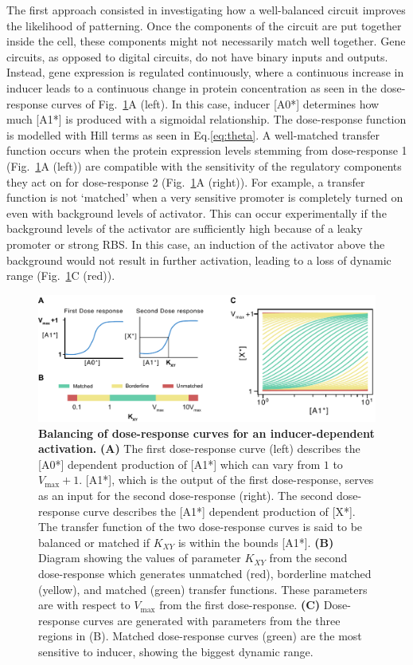The first approach consisted in investigating how a well-balanced circuit improves the likelihood of patterning.
Once the components of the circuit are put together inside the cell,
these components might not necessarily match well together.
Gene circuits, as opposed to digital circuits, do not have binary inputs and outputs.
Instead, gene expression is regulated continuously,
where a continuous increase in inducer leads to a continuous change in protein concentration
as seen in the dose-response curves of Fig.~\ref{fig:balancing}A
(left).
In this case, inducer [A0*] determines how much [A1*] is produced with a sigmoidal relationship.
The dose-response function is modelled with Hill terms as seen in Eq.\ref{eq:theta}.
A well-matched transfer function occurs when the protein expression levels stemming from dose-response 1
(Fig.~\ref{fig:balancing}A (left))
are compatible with the sensitivity of the regulatory components they act on for dose-response 2
(Fig.~\ref{fig:balancing}A (right)).
For example, a transfer function is not ‘matched’
when a very sensitive promoter is completely turned on even with background levels of activator.
This can occur experimentally
if the background levels of the activator are sufficiently high because of a leaky promoter or strong RBS.
In this case, an induction of the activator above the background would not result in further activation,
leading to a loss of dynamic range (Fig.~\ref{fig:balancing}C (red)).


\begin{figure}[H]
    \centering
    \includegraphics[width=1\textwidth]{chapters/Chapter 2/balancing}
    \caption{\textbf{Balancing of dose-response curves for an inducer-dependent activation.} \textbf{(A)} The first dose-response curve (left) describes the [A0*] dependent production of [A1*] which can vary from $1$ to $V_{\max}+1 $. [A1*], which is the output of the first dose-response, serves as an input for the second dose-response (right). The second dose-response curve describes the [A1*] dependent production of [X*]. The transfer function of the two dose-response curves is said to be balanced or matched if $K_{XY}$ is within the bounds [A1*]. \textbf{(B)} Diagram showing the values of parameter $K_{XY}$ from the second dose-response which generates unmatched (red), borderline matched (yellow), and matched (green) transfer functions. These parameters are with respect to $V_{\max}$ from the first dose-response. \textbf{(C)} Dose-response curves are generated with parameters from the three regions in (B). Matched dose-response curves (green) are the most sensitive to inducer, showing the biggest dynamic range.}
    \label{fig:balancing}
\end{figure}


